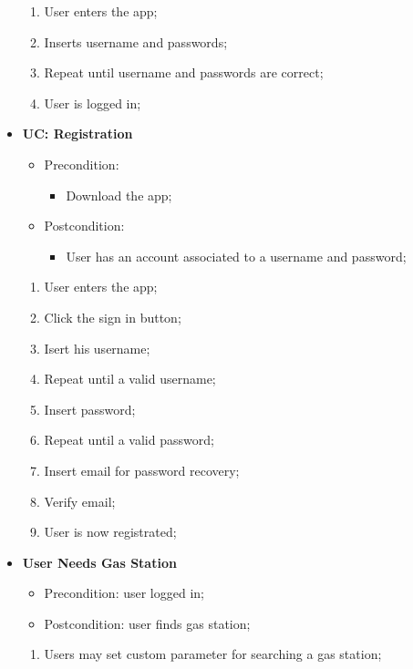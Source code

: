 \documentclass[12pt]{article}
\begin{document}
\begin{itemize}
\begin{itemize}
\begin{itemize}
        \end{itemize}
    \end{itemize}
    \begin{enumerate}
      \item User enters the app;
      \item Inserts username and passwords;
      \item Repeat until username and passwords are correct;
      \item User is logged in;
    \end{enumerate}
  \item \textbf{UC: Registration}
    \begin{itemize}
      \item Precondition:
        \begin{itemize}
          \item Download the app;
        \end{itemize}
      \item Postcondition:
        \begin{itemize}
          \item User has an account associated to a username and password;
        \end{itemize}
    \end{itemize}
    \begin{enumerate}
      \item User enters the app;
      \item Click the sign in button;
      \item Isert his username;
      \item Repeat until a valid username;
      \item Insert password;
      \item Repeat until a valid password;
      \item Insert email for password recovery;
      \item Verify email;
      \item User is now registrated;
    \end{enumerate}
  \item \textbf{User Needs Gas Station}
    \begin{itemize}
      \item Precondition: user logged in;
      \item Postcondition: user finds gas station;
    \end{itemize}
    \begin{enumerate}
      \item Users may set custom parameter for searching a gas station;

\end{enumerate}
\end{itemize}
\end{document}
